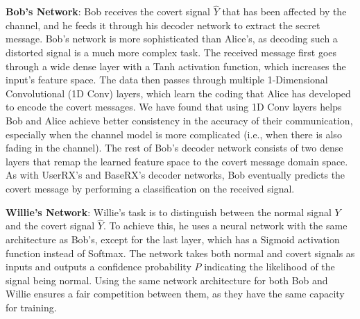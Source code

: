 \textbf{Bob's Network}: Bob receives the covert signal \(\hat{Y}\) that has been affected by the channel, and he feeds it through his decoder network to extract the secret message. Bob's network is more sophisticated than Alice's, as decoding such a distorted signal is a much more complex task. The received message first goes through a wide dense layer with a Tanh activation function, which increases the input's feature space. The data then passes through multiple 1-Dimensional Convolutional (1D Conv) layers, which learn the coding that Alice has developed to encode the covert messages. We have found that using 1D Conv layers helps Bob and Alice achieve better consistency in the accuracy of their communication, especially when the channel model is more complicated (i.e., when there is also fading in the channel). The rest of Bob's decoder network consists of two dense layers that remap the learned feature space to the covert message domain space. As with UserRX's and BaseRX's decoder networks, Bob eventually predicts the covert message by performing a classification on the received signal.


\textbf{Willie's Network}: Willie's task is to distinguish between the normal signal  \(Y\) and the covert  signal \(\hat{Y}\). To achieve this, he uses a neural network with the same architecture as Bob's, except for the last layer, which has a Sigmoid activation function instead of Softmax. The network takes both normal and covert signals as inputs and outputs a confidence probability \(P\) indicating the likelihood of the signal being normal. Using the same network architecture for both Bob and Willie ensures a fair competition between them, as they have the same capacity for training.